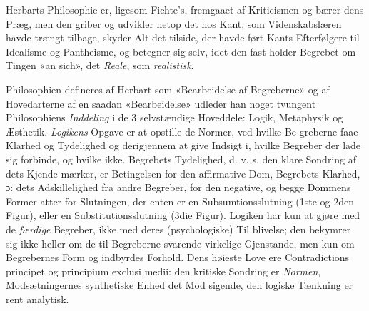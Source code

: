 \documentclass[12pt,a4paper]{book}
\begin{document}
Herbarts Philosophie er, ligesom Fichte's, fremgaaet af
Kriticismen og bærer dens Præg, men den griber og udvikler
netop det hos Kant, som Videnskabslæren havde trængt tilbage,
skyder Alt det tilside, der havde ført Kants Efterfølgere til
Idealisme og Pantheisme, og betegner sig selv, idet den fast\-%
holder Begrebet om Tingen «an sich», det \emph{Reale}, som
\emph{realistisk}.

Philosophien defineres af Herbart som «Bearbeidelse af
Begreberne» og af Hovedarterne af en saadan «Bearbeidelse»
udleder han noget tvungent Philosophiens \emph{Inddeling} i
de 3 selvstændige Hoveddele: Logik, Metaphysik og Æsthetik.
\emph{Logikens} Opgave er at opstille de Normer, ved hvilke Be\-%
greberne faae Klarhed og Tydelighed og derigjennem at give
Indsigt i, hvilke Begreber der lade sig forbinde, og hvilke ikke.
Begrebets Tydelighed, d. v. s. den klare Sondring af dets Kjende\-%
mærker, er Betingelsen for den affirmative Dom, Begrebets
Klarhed, ɔ: dets Adskillelighed fra andre Begreber, for den
negative, og begge Dommens Former atter for Slutningen, der
enten er en Subsumtionsslutning (1ste og 2den Figur), eller en
Substitutionsslutning (3die Figur). Logiken har kun at gjøre med
de \emph{færdige} Begreber, ikke med deres (psychologiske) Til\-%
blivelse; den bekymrer sig ikke heller om de til Begreberne
svarende virkelige Gjenstande, men kun om Begrebernes Form
og indbyrdes Forhold. Dens høieste Love ere Contradictions\-%
principet og principium exclusi medii: den kritiske Sondring
er \emph{Normen}, Modsætningernes synthetiske Enhed det Mod\-%
sigende, den logiske Tænkning er rent analytisk.
\end{document}
